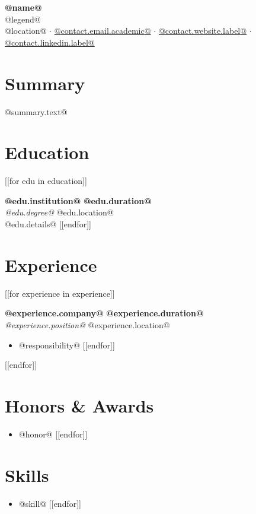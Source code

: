 \documentclass[11pt,a4paper]{article}
\newcommand{\email}[1]{\faEnvelope\hspace{0.5em}\href{mailto:#1}{#1}}
\newcommand{\website}[2]{\faGlobe\hspace{0.5em}\href{#2}{#1}}
\newcommand{\linkedin}[2]{\faLinkedin\hspace{0.5em}\href{#2}{#1}}
\newcommand{\location}[1]{\faMapMarker\hspace{0.5em}#1}
\newcommand{\datedsection}[2]{%
  \par\noindent
  \textbf{#1} \hfill \textbf{#2} \\
}
\newcommand{\role}[2]{%
  \textit{#1} \hfill #2
}
\begin{document}
\begin{center}
    {\Large\textbf{@{name}@}}\\[0.25em]
    {\normalsize @{legend}@}\\[0.25em]
    \location{@{location}@} $\cdot$ \email{@{contact.email.academic}@} $\cdot$ \website{@{contact.website.label}@}{@{contact.website.url}@} $\cdot$ \linkedin{@{contact.linkedin.label}@}{@{contact.linkedin.url}@}
\end{center}

\vspace{0.15em}

\section{Summary}
@{summary.text}@

\section{Education}
[[for edu in education]]
\datedsection{@{edu.institution}@}{@{edu.duration}@}
\role{@{edu.degree}@}{@{edu.location}@}\\
@{edu.details}@
[[endfor]]

\section{Experience}
[[for experience in experience]]
\datedsection{@{experience.company}@}{@{experience.duration}@}
\role{@{experience.position}@}{@{experience.location}@}
\begin{itemize}
[[for responsibility in experience.responsibilities]]
    \item @{responsibility}@
[[endfor]]
\end{itemize}
\vspace{0.25em}
[[endfor]]

\section{Honors \& Awards}
\begin{itemize}
[[for honor in honors]]
    \item @{honor}@
[[endfor]]
\end{itemize}

\section{Skills}
\begin{itemize}
[[for skill in skills]]
    \item @{skill}@
[[endfor]]
\end{itemize}
\end{document}
